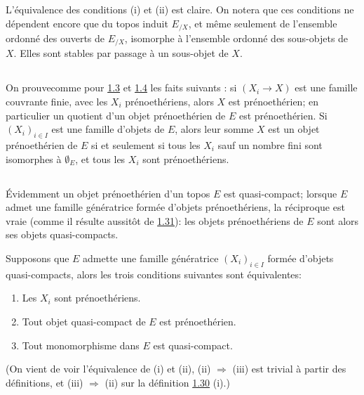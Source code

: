 \documentclass[10pt]{../fichiers-configuration-latex/smfart}
\begin{document}
\subsubsection{}
L'équivalence des conditions (i) et (ii) est claire. On notera que ces
conditions ne dépendent encore que du topos induit $E_{/X}$, et même
seulement de l'ensemble ordonné des ouverts de $E_{/X}$, isomorphe à
l'ensemble ordonné des sous-objets de $X$. Elles sont stables par
passage à un sous-objet de $X$.


\subsection{}
On prouve\pageoriginale comme pour \hyperref[VI.prop1.3]{1.3} et
\hyperref[VI.cor1.4]{1.4} les faits suivants : si $(X_i \to X)$ est une
famille couvrante finie, avec les $X_i$ prénoethériens, alors $X$
est prénoethérien; en particulier un quotient d'un objet
prénoethérien de $E$ est prénoethérien. Si $(X_i)_{i \in I}$ est une
famille d'objets de $E$, alors leur somme $X$ est un objet
prénoethérien de $E$ si et seulement si tous les $X_i$ sauf un
nombre fini sont isomorphes à $∅_{E}$, et tous les $X_i$
sont prénoethériens.

\subsection{}
Évidemment un objet prénoethérien d'un topos $E$ est quasi-compact;
lorsque $E$ admet une famille génératrice formée d'objets
prénoethériens, la réciproque est vraie (comme il résulte aussitôt
de \hyperref[VI.subsec1.31]{1.31}): les objets prénoethériens de $E$ sont alors
ses objets quasi-compacts.

Supposons que $E$ admette une famille génératrice $(X_i)_{i\in I}$
formée d'objets quasi-compacts, alors les trois conditions suivantes
sont équivalentes:
\begin{enumerate}
\renewcommand{\theenumi}{\roman{enumi}}
\renewcommand{\labelenumi}{(\theenumi)}
\item Les $X_i$ sont prénoethériens.

\item Tout objet quasi-compact de $E$ est prénoethérien.

\item Tout monomorphisme dans $E$ est quasi-compact.
\end{enumerate}
\noindent
(On vient de voir l'équivalence de (i) et (ii), (ii) $\Rightarrow$
(iii) est trivial à partir des définitions, et (iii) $\Rightarrow$
(ii) sur la définition \hyperref[VI.def1.30]{1.30} (i).)
\end{document}
